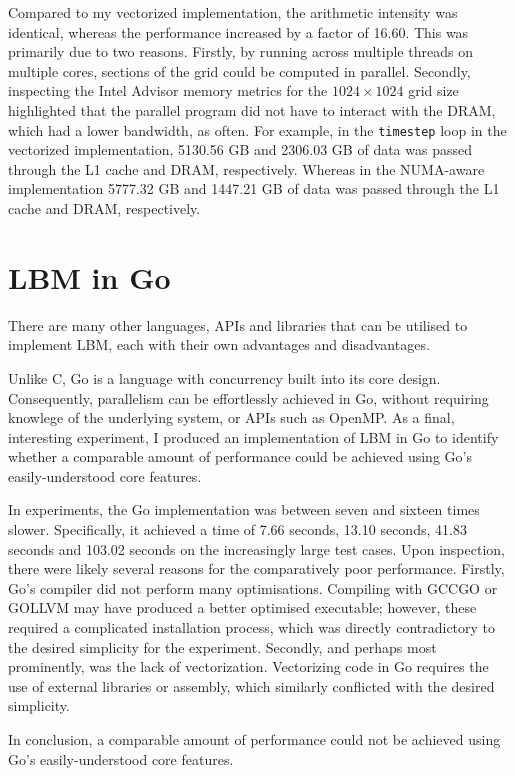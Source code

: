 \documentclass[twocolumn, a4paper]{article}
\begin{document}
Compared to my vectorized implementation, the arithmetic intensity was identical, whereas the performance increased by a factor of 16.60.
This was primarily due to two reasons.
Firstly, by running across multiple threads on multiple cores, sections of the grid could be computed in parallel.
Secondly, inspecting the Intel Advisor memory metrics for the $1024\times1024$ grid size highlighted that the parallel program did not have to interact with the DRAM, which had a lower bandwidth, as often.
For example, in the \texttt{timestep} loop in the vectorized implementation, 5130.56 GB and 2306.03 GB of data was passed through the L1 cache and DRAM, respectively.
Whereas in the NUMA-aware implementation 5777.32 GB and 1447.21 GB of data was passed through the L1 cache and DRAM, respectively. 

\section{LBM in Go}

There are many other languages, APIs and libraries that can be utilised to implement LBM, each with their own advantages and disadvantages.

Unlike C, Go is a language with concurrency built into its core design.
Consequently, parallelism can be effortlessly achieved in Go, without requiring knowlege of the underlying system, or APIs such as OpenMP.
As a final, interesting experiment, I produced an implementation of LBM in Go to identify whether a comparable amount of performance could be achieved using Go's easily-understood core features.

In experiments, the Go implementation was between seven and sixteen times slower.
Specifically, it achieved a time of 7.66 seconds, 13.10 seconds, 41.83 seconds and 103.02 seconds on the increasingly large test cases.
Upon inspection, there were likely several reasons for the comparatively poor performance.
Firstly, Go's compiler did not perform many optimisations.
Compiling with GCCGO or GOLLVM may have produced a better optimised executable; however, these required a complicated installation process, which was directly contradictory to the desired simplicity for the experiment.
Secondly, and perhaps most prominently, was the lack of vectorization.
Vectorizing code in Go requires the use of external libraries or assembly, which similarly conflicted with the desired simplicity.

In conclusion, a comparable amount of performance could not be achieved using Go's easily-understood core features.

\clearpage

\onecolumn{
  \printbibliography
}
\end{document}
